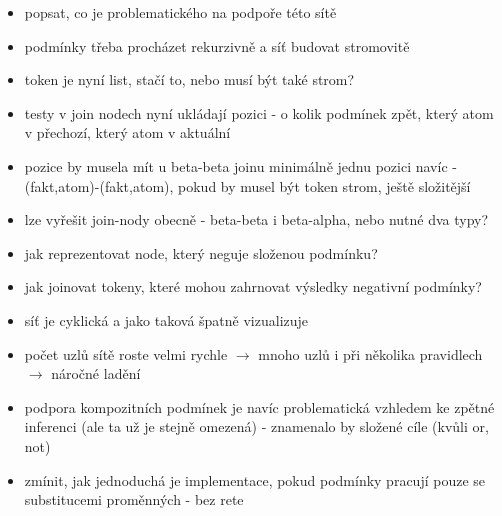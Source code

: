 \begin{framed}
  \begin{itemize}
    \item popsat, co je problematického na podpoře této sítě
    \item podmínky třeba procházet rekurzivně a síť budovat stromovitě
    \item token je nyní list, stačí to, nebo musí být také strom?
    \item testy v join nodech nyní ukládají pozici - o kolik podmínek zpět,
      který atom v přechozí, který atom v aktuální
    \item pozice by musela mít u beta-beta joinu minimálně jednu pozici navíc -
      (fakt,atom)-(fakt,atom), pokud by musel být token strom, ještě složitější
    \item lze vyřešit join-nody obecně - beta-beta i beta-alpha, nebo nutné dva
      typy?
    \item jak reprezentovat node, který neguje složenou podmínku?
    \item jak joinovat tokeny, které mohou zahrnovat výsledky negativní podmínky?
    \item síť je cyklická a jako taková špatně vizualizuje
    \item počet uzlů sítě roste velmi rychle $\rightarrow$ mnoho uzlů i při
      několika pravidlech $\rightarrow$ náročné ladění
    \item podpora kompozitních podmínek je navíc problematická vzhledem ke
      zpětné inferenci (ale ta už je stejně omezená) - znamenalo by složené cíle
      (kvůli or, not)
    \item zmínit, jak jednoduchá je implementace, pokud podmínky pracují pouze
      se substitucemi proměnných - bez rete
  \end{itemize}
\end{framed}
